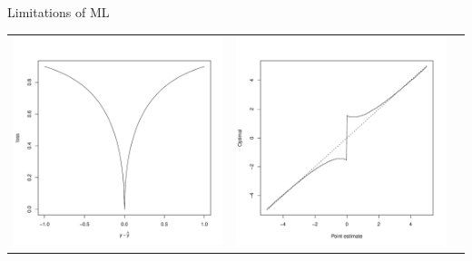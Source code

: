 \documentclass[final]{beamer}
\newlength{\onecolwid}
\begin{document}
\begin{frame}[t]
\begin{columns}[t]
\begin{column}{\onecolwid}
\begin{block}{Limitations of ML}
\begin{center}
\begin{tabular}{ccc}
\includegraphics[scale = 0.5, trim = 1in 1in 0.5in 1in, clip]{loss_3.pdf} &
\includegraphics[scale = 0.5, trim = 1in 1in 0.5in 1in, clip]{zero2.pdf}\\

\end{tabular}
\end{center}
\end{block}
\end{column}
\end{columns}
\end{frame}
\end{document}
